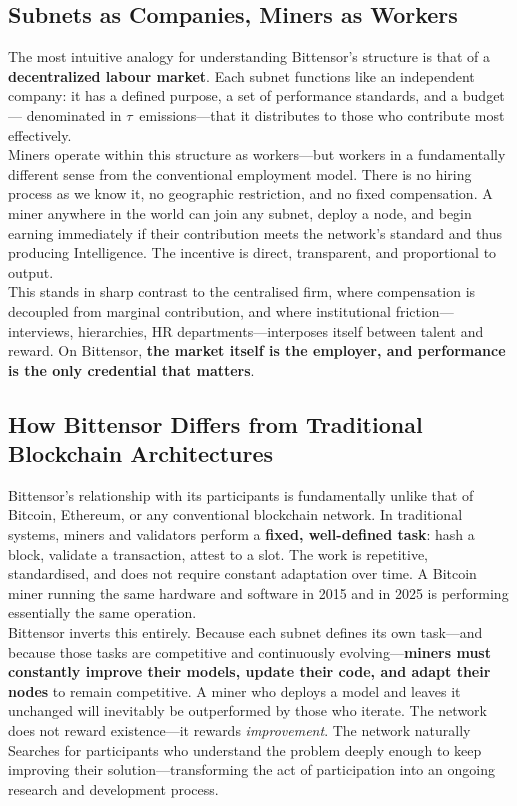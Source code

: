 \documentclass[12pt, a4paper, oneside]{report}
\newcommand{\TAO}{$\tau$}            %
\theoremstyle{definition}
\begin{document}
\subsection{Subnets as Companies, Miners as Workers}

The most intuitive analogy for understanding Bittensor's structure is that of a 
\textbf{decentralized labour market}. Each subnet functions like an independent 
company: it has a defined purpose, a set of performance standards, and a budget—
denominated in \TAO\ emissions—that it distributes to those who contribute most 
effectively.\\[0.4cm]

Miners operate within this structure as workers—but workers in a fundamentally 
different sense from the conventional employment model. There is no hiring process as we know it, 
no geographic restriction, and no fixed compensation. A miner anywhere in the world 
can join any subnet, deploy a node, and begin earning immediately if their 
contribution meets the network's standard and thus producing Intelligence. The incentive is direct, transparent, 
and proportional to output.\\[0.4cm]

This stands in sharp contrast to the centralised firm, where compensation is 
decoupled from marginal contribution, and where institutional friction—interviews, 
hierarchies, HR departments—interposes itself between talent and reward. On 
Bittensor, \textbf{the market itself is the employer, and performance is the 
only credential that matters}.

\subsection{How Bittensor Differs from Traditional Blockchain Architectures}

Bittensor's relationship with its participants is fundamentally unlike that of 
Bitcoin, Ethereum, or any conventional blockchain network. In traditional systems, 
miners and validators perform a \textbf{fixed, well-defined task}: hash a block, 
validate a transaction, attest to a slot. The work is repetitive, standardised, 
and does not require constant adaptation over time. A Bitcoin miner running the same 
hardware and software in 2015 and in 2025 is performing essentially the same 
operation.\\[0.4cm]

Bittensor inverts this entirely. Because each subnet defines its own task—and 
because those tasks are competitive and continuously evolving—\textbf{miners must 
constantly improve their models, update their code, and adapt their nodes} to remain 
competitive. A miner who deploys a model and leaves it unchanged will inevitably be 
outperformed by those who iterate. The network does not reward existence—it rewards 
\emph{improvement}. The network 
naturally Searches for participants who understand the problem deeply enough to keep 
improving their solution—transforming the act of participation into an ongoing 
research and development process.\\[0.4cm]
\end{document}
